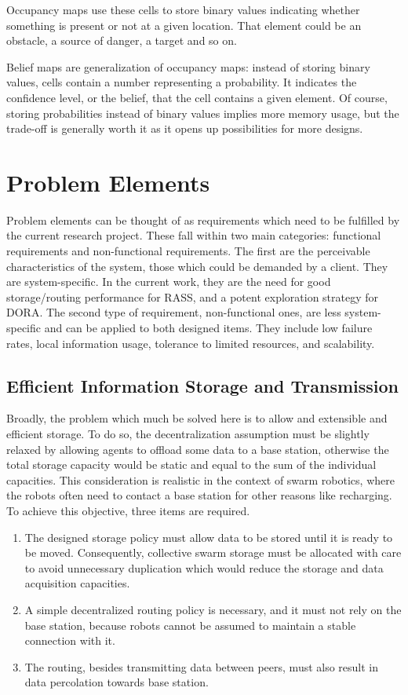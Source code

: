 Occupancy maps use these cells to store binary values indicating whether something is present or not at a given location. That element could be an obstacle, a source of danger, a target and so on.

Belief maps are generalization of occupancy maps: instead of storing binary values, cells contain a number representing a probability. It indicates the confidence level, or the belief, that the cell contains a given element. Of course, storing probabilities instead of binary values implies more memory usage, but the trade-off is generally worth it as it opens up possibilities for more designs. 

\clearpage

\section{Problem Elements}  %

Problem elements can be thought of as requirements which need to be fulfilled by the current research project. These fall within two main categories: functional requirements and non-functional requirements. The first are the perceivable characteristics of the system, those which could be demanded by a client. They are system-specific. In the current work, they are the need for good storage/routing performance for \ac{RASS}, and a potent exploration strategy for \ac{DORA}. The second type of requirement, non-functional ones, are less system-specific and can be applied to both designed items. They include low failure rates, local information usage, tolerance to limited resources, and scalability.  

\subsection{Efficient Information Storage and Transmission}
Broadly, the problem which much be solved here is to allow and extensible and efficient storage. To do so, the decentralization assumption must be slightly relaxed by allowing agents to offload some data to a base station, otherwise the total storage capacity would be static and equal to the sum of the individual capacities. This consideration is realistic in the context of swarm robotics, where the robots often need to contact a base station for other reasons like recharging. To achieve this objective, three items are required.

\begin{enumerate}
    \item The designed storage policy must allow data to be stored until it is ready to be moved. Consequently, collective swarm storage must be allocated with care to avoid unnecessary duplication which would reduce the storage and data acquisition capacities.
    \item A simple decentralized routing policy is necessary, and it must not rely on the base station, because robots cannot be assumed to maintain a stable connection with it.
    \item The routing, besides transmitting data between peers, must also result in data percolation towards base station.
\end{enumerate}

